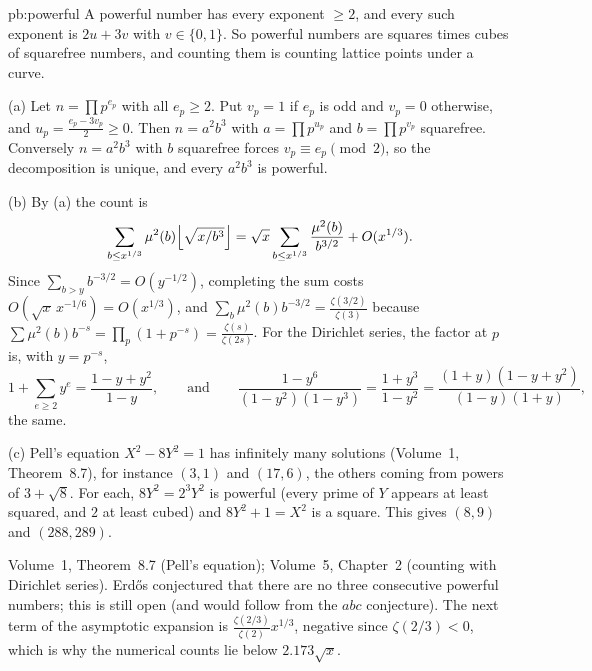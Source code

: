 \begin{solution}{pb:powerful}
\idea A powerful number has every exponent $\ge2$, and every such exponent is $2u+3v$ with $v\in\{0,1\}$. So powerful numbers are
squares times cubes of squarefree numbers, and counting them is counting lattice points under a curve.

\writeup (a) Let $n=\prod p^{e_p}$ with all $e_p\ge2$. Put $v_p=1$ if $e_p$ is odd and $v_p=0$ otherwise, and $u_p=\frac{e_p-3v_p}2\ge0$. Then
$n=a^2b^3$ with $a=\prod p^{u_p}$ and $b=\prod p^{v_p}$ squarefree. Conversely $n=a^2b^3$ with $b$ squarefree forces $v_p\equiv e_p\pmod2$,
so the decomposition is unique, and every $a^2b^3$ is powerful.

(b) By (a) the count is
\[
\sum_{b\le x^{1/3}}\mu^2(b)\Bigl\lfloor\sqrt{x/b^3}\Bigr\rfloor=\sqrt x\sum_{b\le x^{1/3}}\frac{\mu^2(b)}{b^{3/2}}+O(x^{1/3}).
\]
Since $\sum_{b>y}b^{-3/2}=O(y^{-1/2})$, completing the sum costs $O(\sqrt x\,x^{-1/6})=O(x^{1/3})$, and
$\sum_b\mu^2(b)b^{-3/2}=\frac{\zeta(3/2)}{\zeta(3)}$ because $\sum\mu^2(b)b^{-s}=\prod_p(1+p^{-s})=\frac{\zeta(s)}{\zeta(2s)}$. For the Dirichlet series,
the factor at $p$ is, with $y=p^{-s}$,
\[
1+\sum_{e\ge2}y^e=\frac{1-y+y^2}{1-y},\qquad\text{and}\qquad\frac{1-y^6}{(1-y^2)(1-y^3)}=\frac{1+y^3}{1-y^2}=\frac{(1+y)(1-y+y^2)}{(1-y)(1+y)},
\]
the same.

(c) Pell's equation $X^2-8Y^2=1$ has infinitely many solutions (Volume~1, Theorem~8.7), for instance $(3,1)$ and $(17,6)$, the
others coming from powers of $3+\sqrt8$. For each, $8Y^2=2^3Y^2$ is powerful (every prime of $Y$ appears at least squared, and $2$ at
least cubed) and $8Y^2+1=X^2$ is a square. This gives $(8,9)$ and $(288,289)$.

\tools Volume~1, Theorem~8.7 (Pell's equation); Volume~5, Chapter~2 (counting with Dirichlet series).
\leads Erdős conjectured that there are no three consecutive powerful numbers; this is still open (and would follow from the
$abc$ conjecture). The next term of the asymptotic expansion is $\frac{\zeta(2/3)}{\zeta(2)}x^{1/3}$, negative since $\zeta(2/3)<0$, which is why
the numerical counts lie below $2.173\sqrt x$.
\end{solution}

